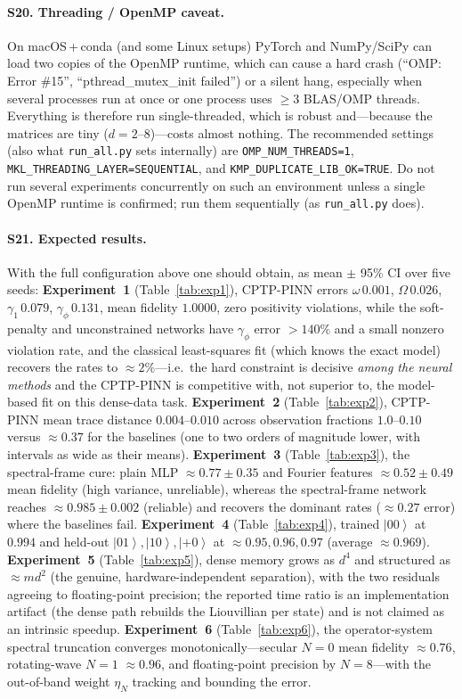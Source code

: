 \documentclass[11pt]{article}
\newcommand{\ket}[1]{\left\lvert #1 \right\rangle}
\begin{document}
\paragraph{S20. Threading / OpenMP caveat.}
On macOS\,+\,conda (and some Linux setups) PyTorch and NumPy/SciPy can load two copies of the OpenMP runtime, which can cause a hard crash (``OMP: Error \#15'', ``pthread\_mutex\_init failed'') or a silent hang, especially when several processes run at once or one process uses $\ge3$ BLAS/OMP threads. Everything is therefore run single-threaded, which is robust and---because the matrices are tiny ($d=2$--$8$)---costs almost nothing. The recommended settings (also what \texttt{run\_all.py} sets internally) are \texttt{OMP\_NUM\_THREADS=1}, \texttt{MKL\_THREADING\_LAYER=SEQUENTIAL}, and \texttt{KMP\_DUPLICATE\_LIB\_OK=TRUE}. Do not run several experiments concurrently on such an environment unless a single OpenMP runtime is confirmed; run them sequentially (as \texttt{run\_all.py} does).

\paragraph{S21. Expected results.}
With the full configuration above one should obtain, as mean $\pm$ 95\% CI over five seeds: \textbf{Experiment~1} (Table~\ref{tab:exp1}), CPTP-PINN errors $\omega\,0.001$, $\Omega\,0.026$, $\gamma_1\,0.079$, $\gamma_\phi\,0.131$, mean fidelity $1.0000$, zero positivity violations, while the soft-penalty and unconstrained networks have $\gamma_\phi$ error $>140\%$ and a small nonzero violation rate, and the classical least-squares fit (which knows the exact model) recovers the rates to $\approx2\%$---i.e.\ the hard constraint is decisive \emph{among the neural methods} and the CPTP-PINN is competitive with, not superior to, the model-based fit on this dense-data task. \textbf{Experiment~2} (Table~\ref{tab:exp2}), CPTP-PINN mean trace distance $0.004$--$0.010$ across observation fractions $1.0$--$0.10$ versus $\approx0.37$ for the baselines (one to two orders of magnitude lower, with intervals as wide as their means). \textbf{Experiment~3} (Table~\ref{tab:exp3}), the spectral-frame cure: plain MLP $\approx0.77\pm0.35$ and Fourier features $\approx0.52\pm0.49$ mean fidelity (high variance, unreliable), whereas the spectral-frame network reaches $\approx0.985\pm0.002$ (reliable) and recovers the dominant rates ($\approx0.27$ error) where the baselines fail. \textbf{Experiment~4} (Table~\ref{tab:exp4}), trained $\ket{00}$ at $0.994$ and held-out $\ket{01},\ket{10},\ket{+0}$ at $\approx0.95,0.96,0.97$ (average $\approx0.969$). \textbf{Experiment~5} (Table~\ref{tab:exp5}), dense memory grows as $d^4$ and structured as $\approx m d^2$ (the genuine, hardware-independent separation), with the two residuals agreeing to floating-point precision; the reported time ratio is an implementation artifact (the dense path rebuilds the Liouvillian per state) and is not claimed as an intrinsic speedup. \textbf{Experiment~6} (Table~\ref{tab:exp6}), the operator-system spectral truncation converges monotonically---secular $N{=}0$ mean fidelity $\approx0.76$, rotating-wave $N{=}1$ $\approx0.96$, and floating-point precision by $N{=}8$---with the out-of-band weight $\eta_N$ tracking and bounding the error.
\end{document}
